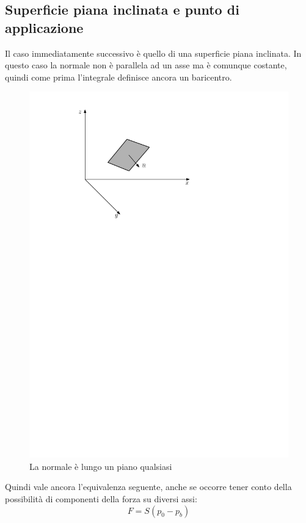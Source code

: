 \subsection{Superficie piana inclinata e punto di applicazione}
Il caso immediatamente successivo è quello di una superficie piana inclinata.
In questo caso la normale non è parallela ad un asse ma è comunque costante, quindi come prima l'integrale definisce ancora un baricentro.
	\begin{figure}[ht]
		\includegraphics[scale=0.75]{./2.4 Spinte sulle superfici/2.4-2}
		\centering
		\caption{La normale è lungo un piano qualsiasi}
	\end{figure}
Quindi vale ancora l'equivalenza seguente, anche se occorre tener conto della possibilità di componenti della forza su diversi assi:
	\begin{equation*}
		F = S (p_0 - p_b)
	\end{equation*}

